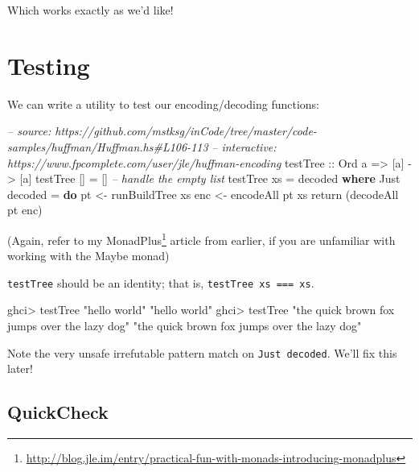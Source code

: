 \documentclass[]{article}
\newenvironment{Shaded}{\begin{snugshade}}{\end{snugshade}}
\newcommand{\CommentTok}[1]{\textcolor[rgb]{0.56,0.35,0.01}{\textit{#1}}}
\newcommand{\DataTypeTok}[1]{\textcolor[rgb]{0.13,0.29,0.53}{#1}}
\newcommand{\FunctionTok}[1]{\textcolor[rgb]{0.00,0.00,0.00}{#1}}
\newcommand{\KeywordTok}[1]{\textcolor[rgb]{0.13,0.29,0.53}{\textbf{#1}}}
\newcommand{\NormalTok}[1]{#1}
\newcommand{\OtherTok}[1]{\textcolor[rgb]{0.56,0.35,0.01}{#1}}
\newcommand{\StringTok}[1]{\textcolor[rgb]{0.31,0.60,0.02}{#1}}
\renewcommand{\href}[2]{#2\footnote{\url{#1}}}
\begin{document}
Which works exactly as we'd like!

\hypertarget{testing}{%
\section{Testing}\label{testing}}

We can write a utility to test our encoding/decoding functions:

\begin{Shaded}
\begin{Highlighting}[]
\CommentTok{-- source: https://github.com/mstksg/inCode/tree/master/code-samples/huffman/Huffman.hs#L106-113}
\CommentTok{-- interactive: https://www.fpcomplete.com/user/jle/huffman-encoding}
\OtherTok{testTree ::} \DataTypeTok{Ord}\NormalTok{ a }\OtherTok{=>}\NormalTok{ [a] }\OtherTok{->}\NormalTok{ [a]}
\NormalTok{testTree [] }\FunctionTok{=}\NormalTok{ []                    }\CommentTok{-- handle the empty list}
\NormalTok{testTree xs }\FunctionTok{=}\NormalTok{ decoded}
  \KeywordTok{where}
    \DataTypeTok{Just}\NormalTok{ decoded }\FunctionTok{=} \KeywordTok{do}
\NormalTok{      pt  }\OtherTok{<-}\NormalTok{ runBuildTree xs}
\NormalTok{      enc }\OtherTok{<-}\NormalTok{ encodeAll pt xs}
\NormalTok{      return (decodeAll pt enc)}
\end{Highlighting}
\end{Shaded}

(Again, refer to my
\href{http://blog.jle.im/entry/practical-fun-with-monads-introducing-monadplus}{MonadPlus}
article from earlier, if you are unfamiliar with working with the Maybe monad)

\texttt{testTree} should be an identity; that is,
\texttt{testTree\ xs\ ===\ xs}.

\begin{Shaded}
\begin{Highlighting}[]
\NormalTok{ghci}\FunctionTok{>}\NormalTok{ testTree }\StringTok{"hello world"}
\StringTok{"hello world"}
\NormalTok{ghci}\FunctionTok{>}\NormalTok{ testTree }\StringTok{"the quick brown fox jumps over the lazy dog"}
\StringTok{"the quick brown fox jumps over the lazy dog"}
\end{Highlighting}
\end{Shaded}

Note the very unsafe irrefutable pattern match on \texttt{Just\ decoded}. We'll
fix this later!

\hypertarget{quickcheck}{%
\subsection{QuickCheck}\label{quickcheck}}
\end{document}
